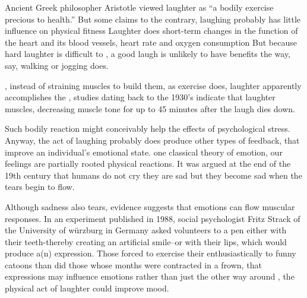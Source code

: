 Ancient Greek philosopher Aristotle viewed laughter as ``a bodily exercise precious to health.'' But \underline{\quad} some claims to the contrary, laughing probably has little influence on physical fitness Laughter does \underline{\quad} short-term changes in the function of the heart and its blood vessels, \underline{\quad} heart rate and oxygen consumption But because hard laughter is difficult to \underline{\quad}, a good laugh is unlikely to have \underline{\quad} benefits the way, say, walking or jogging does.

\underline{\quad}, instead of straining muscles to build them, as exercise does, laughter apparently accomplishes the \underline{\quad}, studies dating back to the 1930’s indicate that laughter \underline{\quad} muscles, decreasing muscle tone for up to 45 minutes after the laugh dies down.

Such bodily reaction might conceivably help \underline{\quad} the effects of psychological stress. Anyway, the act of laughing probably does produce other types of \underline{\quad} feedback, that improve an individual’s emotional state. \underline{\quad} one classical theory of emotion, our feelings are partially rooted \underline{\quad} physical reactions. It was argued at the end of the 19th century that humans do not cry \underline{\quad} they are sad but they become sad when the tears begin to flow.

Although sadness also \underline{\quad} tears, evidence suggests that emotions can flow \underline{\quad} muscular responses. In an experiment published in 1988, social psychologist Fritz Strack of the University of würzburg in Germany asked volunteers to \underline{\quad} a pen either with their teeth-thereby creating an artificial smile--or with their lips, which would produce a(n) \underline{\quad} expression. Those forced to exercise their enthusiastically to funny catoons than did those whose months were contracted in a frown, \underline{\quad} that expressions may influence emotions rather than just the other way around \underline{\quad}, the physical act of laughter could improve mood.

